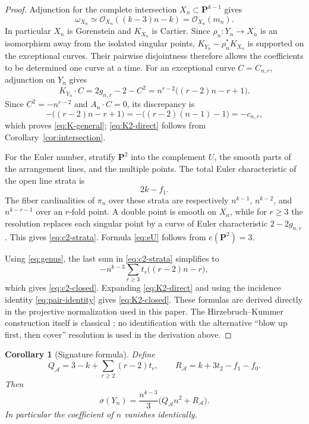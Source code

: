 \documentclass[11pt]{article}
\newtheorem{corollary}[theorem]{Corollary}
\newcommand{\PP}{\mathbf P}
\newcommand{\OO}{\mathcal O}
\newcommand{\cA}{\mathcal A}
\newcommand{\sig}{\sigma}
\begin{document}
\begin{proof}
Adjunction for the complete intersection $X_n\subset\PP^{k-1}$ gives
\[
        \omega_{X_n}\simeq\OO_{X_n}((k-3)n-k)=\OO_{X_n}(m_n).
\]
In particular $X_n$ is Gorenstein and $K_{X_n}$ is Cartier.  Since
$\rho_n:Y_n\to X_n$ is an isomorphism away from the isolated singular points,
$K_{Y_n}-\rho_n^*K_{X_n}$ is supported on the exceptional curves.  Their pairwise
disjointness therefore allows the coefficients to be determined one curve at a
time.  For an exceptional curve $C=C_{n,r}$, adjunction on $Y_n$ gives
\[
 K_{Y_n}\cdot C=2g_{n,r}-2-C^2
 =n^{r-2}\bigl((r-2)n-r+1\bigr).
\]
Since $C^2=-n^{r-2}$ and $A_n\cdot C=0$, its discrepancy is
\[
 -\bigl((r-2)n-r+1\bigr)
 =-\bigl((r-2)(n-1)-1\bigr)=-c_{n,r},
\]
which proves \eqref{eq:K-general}; \eqref{eq:K2-direct} follows from
Corollary~\ref{cor:intersection}.

For the Euler number, stratify $\PP^2$ into the complement $U$, the smooth
parts of the arrangement lines, and the multiple points.  The total Euler
characteristic of the open line strata is
\[
        2k-f_1.
\]
The fiber cardinalities of $\pi_n$ over these strata are respectively
$n^{k-1}$, $n^{k-2}$, and $n^{k-r-1}$ over an $r$-fold point.  A double point is
smooth on $X_n$, while for $r\ge3$ the resolution replaces each singular point
by a curve of Euler characteristic $2-2g_{n,r}$.  This gives
\eqref{eq:c2-strata}.  Formula \eqref{eq:eU} follows from
$e(\PP^2)=3$.

Using \eqref{eq:genus}, the last sum in \eqref{eq:c2-strata} simplifies to
\[
 -n^{k-3}\sum_{r\ge3}t_r\bigl((r-2)n-r\bigr),
\]
which gives \eqref{eq:c2-closed}.  Expanding \eqref{eq:K2-direct} and using the
incidence identity \eqref{eq:pair-identity} gives \eqref{eq:K2-closed}.
These formulas are derived directly in the projective normalization used in this
paper.  The Hirzebruch--Kummer construction itself is classical
\cite{Hirzebruch,Pokora2019}; no identification with the alternative
``blow up first, then cover'' resolution is used in the derivation above.
\end{proof}

\begin{corollary}[Signature formula]\label{cor:signature-formula}
Define
\begin{equation}\label{eq:QR}
 Q_{\cA}=3-k+\sum_{r\ge2}(r-2)t_r,
 \qquad
 R_{\cA}=k+3t_2-f_1-f_0.
\end{equation}
Then
\begin{equation}\label{eq:signature-formula}
 \boxed{
 \sig(Y_n)=\frac{n^{k-3}}3\bigl(Q_{\cA}n^2+R_{\cA}\bigr).}
\end{equation}
In particular the coefficient of $n$ vanishes identically.
\end{corollary}
\end{document}
